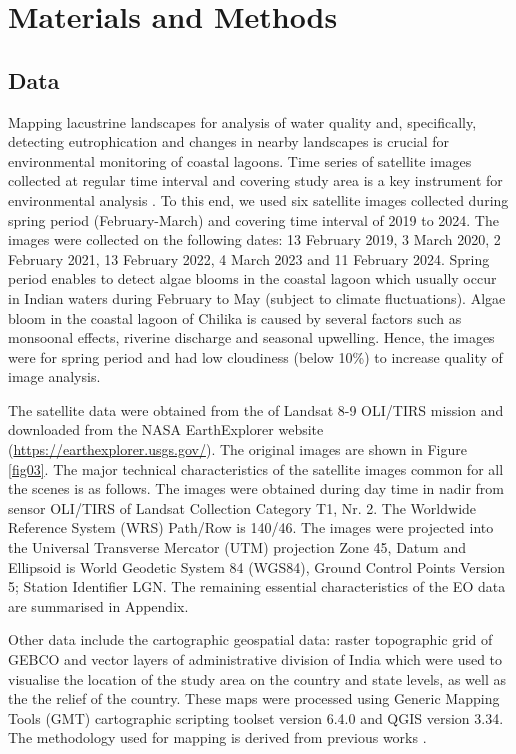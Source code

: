 \documentclass[jmse,article,submit,pdftex,moreauthors]{Definitions/mdpi}
\begin{document}
\section{Materials and Methods}

\subsection{Data}

Mapping lacustrine landscapes for analysis of water quality and, specifically, detecting eutrophication and changes in nearby landscapes is crucial for environmental monitoring of coastal lagoons. Time series of satellite images collected at regular time interval and covering study area is a key instrument for environmental analysis \cite{Lemenkova202324}. To this end, we used six satellite images collected during spring period (February-March) and covering time interval of 2019 to 2024. The images were collected on the following dates: 13 February 2019, 3 March 2020, 2 February 2021, 13 February 2022, 4 March 2023 and 11 February 2024. Spring period enables to detect algae blooms in the coastal lagoon which usually occur in Indian waters during February to May (subject to climate fluctuations). Algae bloom in the coastal lagoon of Chilika is caused by several factors such as monsoonal effects, riverine discharge and seasonal upwelling. Hence, the images were for spring period and had low cloudiness (below 10\%) to increase quality of image analysis.

The satellite data were obtained from the of Landsat 8-9 OLI/TIRS mission and downloaded from the NASA EarthExplorer website (\href{https://earthexplorer.usgs.gov/}{https://earthexplorer.usgs.gov/}). The original images are shown in Figure \ref{fig03}. The major technical characteristics of the satellite images common for all the scenes is as follows. The images were obtained during day time in nadir from sensor OLI/TIRS of Landsat Collection Category T1, Nr. 2. The Worldwide Reference System (WRS) Path/Row is 140/46. The images were projected into the Universal Transverse Mercator (UTM) projection Zone 45, Datum and Ellipsoid is World Geodetic System 84 (WGS84), Ground Control Points Version 5; Station Identifier LGN. The remaining essential characteristics of the EO data are summarised in Appendix.

Other data include the cartographic geospatial data: raster topographic grid of GEBCO and vector layers of administrative division of India which were used to visualise the location of the study area on the country and state levels, as well as the the relief of the country. These maps were processed using Generic Mapping Tools (GMT) cartographic scripting toolset version 6.4.0 \cite{Wessel} and QGIS version 3.34. The methodology used for mapping is derived from previous works \cite{Lemenkova202217,Lemenkova202212,Lemenkova202203}.
\end{document}
